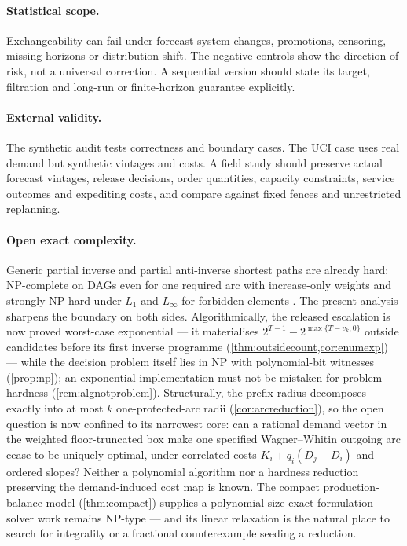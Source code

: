 \documentclass[11pt]{article}
\theoremstyle{definition}
\begin{document}
\paragraph{Statistical scope.}
Exchangeability can fail under forecast-system changes, promotions, censoring, missing horizons or distribution shift. The negative controls show the direction of risk, not a universal correction. A sequential version should state its target, filtration and long-run or finite-horizon guarantee explicitly.

\paragraph{External validity.}
The synthetic audit tests correctness and boundary cases. The UCI case uses real demand but synthetic vintages and costs. A field study should preserve actual forecast vintages, release decisions, order quantities, capacity constraints, service outcomes and expediting costs, and compare against fixed fences and unrestricted replanning.

\paragraph{Open exact complexity.}
Generic partial inverse and partial anti-inverse shortest paths are already hard: NP-complete on DAGs even for one required arc with increase-only weights \parencite{LeyMerkert2025} and strongly NP-hard under $L_1$ and $L_\infty$ for forbidden elements \parencite{Gassner2009}. The present analysis sharpens the boundary on both sides. Algorithmically, the released escalation is now proved worst-case exponential --- it materialises $2^{T-1}-2^{\max\{T-v_k,0\}}$ outside candidates before its first inverse programme (\cref{thm:outsidecount,cor:enumexp}) --- while the decision problem itself lies in NP with polynomial-bit witnesses (\cref{prop:np}); an exponential implementation must not be mistaken for problem hardness (\cref{rem:algnotproblem}). Structurally, the prefix radius decomposes exactly into at most $k$ one-protected-arc radii (\cref{cor:arcreduction}), so the open question is now confined to its narrowest core: can a rational demand vector in the weighted floor-truncated box make one specified Wagner--Whitin outgoing arc cease to be uniquely optimal, under correlated costs $K_i+q_i(D_j-D_i)$ and ordered slopes? Neither a polynomial algorithm nor a hardness reduction preserving the demand-induced cost map is known. The compact production-balance model (\cref{thm:compact}) supplies a polynomial-size exact formulation --- solver work remains NP-type --- and its linear relaxation is the natural place to search for integrality or a fractional counterexample seeding a reduction.
\end{document}
